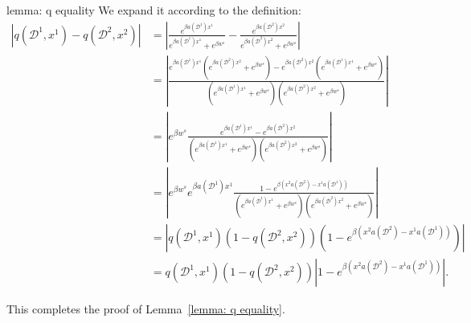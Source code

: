 \begin{proofof}{lemma: q equality}
We expand it according to the definition:
\begin{align*}
\left| q(\mathcal{D}^1, x^1) - q(\mathcal{D}^2, x^2) \right| &= \left| \frac{e^{\beta a(\mathcal{D}^1) x^1}}{e^{\beta a(\mathcal{D}^1) x^1} + e^{\beta w^s}} - \frac{e^{\beta a(\mathcal{D}^2) x^2}}{e^{\beta a(\mathcal{D}^2) x^2} + e^{\beta w^s}}\right| \\
&= \left| \frac{e^{\beta a(\mathcal{D}^1) x^1} \left( e^{\beta a(\mathcal{D}^2) x^2} + e^{\beta w^s} \right) - e^{\beta a(\mathcal{D}^2) x^2} \left( e^{\beta a(\mathcal{D}^1) x^1} + e^{\beta w^s} \right)}{\left( e^{\beta a(\mathcal{D}^1) x^1} + e^{\beta w^s} \right) \left( e^{\beta a(\mathcal{D}^2) x^2} + e^{\beta w^s} \right)} \right| \\
&= \left| e^{\beta w^s} \frac{e^{\beta a(\mathcal{D}^1) x^1} - e^{\beta a(\mathcal{D}^2) x^2}}{\left( e^{\beta a(\mathcal{D}^1) x^1} + e^{\beta w^s} \right) \left( e^{\beta a(\mathcal{D}^2) x^2} + e^{\beta w^s} \right)} \right| \\
&= \left| e^{\beta w^s} e^{\beta a(\mathcal{D}^1) x^1} \frac{1 - e^{\beta \left(x^2 a(\mathcal{D}^2) - x^1 a(\mathcal{D}^1) \right)}}{\left( e^{\beta a(\mathcal{D}^1) x^1} + e^{\beta w^s} \right) \left( e^{\beta a(\mathcal{D}^2) x^2} + e^{\beta w^s} \right)} \right| \\
&= \left| q(\mathcal{D}^1, x^1) \left(1-q(\mathcal{D}^2, x^2) \right) \left( 1 - e^{\beta \left(x^2 a(\mathcal{D}^2) - x^1 a(\mathcal{D}^1) \right)} \right) \right| \\
&= q(\mathcal{D}^1, x^1) \left(1-q(\mathcal{D}^2, x^2)\right) \left| 1 - e^{\beta \left(x^2 a(\mathcal{D}^2) - x^1 a(\mathcal{D}^1) \right)} \right|.
\end{align*}

This completes the proof of Lemma~\ref{lemma: q equality}.
\end{proofof}















